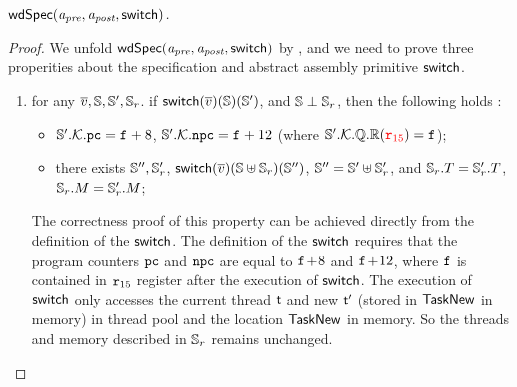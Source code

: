 \begin{lemma}
    \em
    \label{lemma:wdspec}
    $\textsf{wdSpec}({\textit{a}_\textit{pre}}, {\textit{a}_\textit{post}}, {\mathsf{switch}})$. 
\end{lemma}
\begin{proof}
    We unfold $\textsf{wdSpec}({\textit{a}_\textit{pre}}, {\textit{a}_\textit{post}}, {\mathsf{switch}})$ by \Def{\ref{def:well-defined specification}}, 
    and we need to prove three properities about the specification and 
    abstract assembly primitive $\mathsf{switch}$. 
    \begin{enumerate}
        \item 
        for any $\overline{v}, \mathbb{S}, \mathbb{S}', \mathbb{S}_r$. 
            if $\mathsf{switch}(\overline{v})(\mathbb{S})(\mathbb{S}')$, and 
            $\mathbb{S} \perp \mathbb{S}_r$, 
            then the following holds : 
            \begin{itemize}
                \item $\mathbb{S}'.\mathcal{K}.\texttt{pc} = \texttt{f}_{} + 8$, 
                    $\mathbb{S}'.\mathcal{K}.\texttt{npc} = \texttt{f}_{} + 12$
                    (where $\mathbb{S}'.\mathcal{K}.\mathbb{Q}.\mathbb{R}
                        ({\color{red} \texttt{r}_{15}}) = \texttt{f}_{}$);
                \item there exists $\mathbb{S}'', \mathbb{S}_r'$, 
                    $\mathsf{switch}(\overline{v})(\mathbb{S} \uplus \mathbb{S}_r) 
                        (\mathbb{S}'')$, $\mathbb{S}'' = \mathbb{S}' \uplus \mathbb{S}_r'$, 
                    and $\mathbb{S}_r.T = \mathbb{S}_r'.T$, 
                    $\mathbb{S}_r.M = \mathbb{S}_r'.M$; 
            \end{itemize}
        \vspace*{0.3em}
        The correctness proof of this property can be achieved directly from the definition 
        of the $\mathsf{switch}$. The definition of the $\mathsf{switch}$ requires that 
        the program counters $\texttt{pc}$ and $\texttt{npc}$ are equal to 
        $\texttt{f}_{}\!+\!8$ and $\texttt{f}_{}\!+\!12$, where $\texttt{f}_{}$ is 
        contained in $\texttt{r}_{15}$ register after the execution of 
        $\mathsf{switch}$. The execution of $\mathsf{switch}$ only accesses 
        the current thread $\textsf{t}$ and new $\textsf{t}'$ (stored in $\mathsf{TaskNew}$ in memory) 
        in thread pool and the location $\mathsf{TaskNew}$ in memory. 
        So the threads and memory described in $\mathbb{S}_r$ 
        remains unchanged.


\end{enumerate}
\end{proof}
